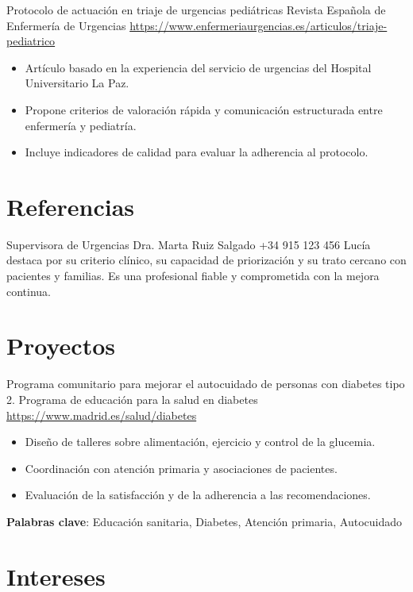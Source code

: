 \documentclass[a4paper, serif, 10pt]{moderncv}
\begin{document}
        {Protocolo de actuación en triaje de urgencias pediátricas}
        {Revista Española de Enfermería de Urgencias}
        {\url{https://www.enfermeriaurgencias.es/articulos/triaje-pediatrico}}
        {}
        {\begin{itemize}
\item Artículo basado en la experiencia del servicio de urgencias del Hospital Universitario La Paz.
\item Propone criterios de valoración rápida y comunicación estructurada entre enfermería y pediatría.
\item Incluye indicadores de calidad para evaluar la adherencia al protocolo.
\end{itemize}}
\section{Referencias}

        {Supervisora de Urgencias}
        {Dra. Marta Ruiz Salgado}
        {+34 915 123 456}
        {}
        {Lucía destaca por su criterio clínico, su capacidad de priorización y su trato cercano con pacientes y familias. Es una profesional fiable y comprometida con la mejora continua.}
\section{Proyectos}

        {Programa comunitario para mejorar el autocuidado de personas con diabetes tipo 2.}
        {Programa de educación para la salud en diabetes}
        {\url{https://www.madrid.es/salud/diabetes}}
        {}
        {\begin{itemize}
\item Diseño de talleres sobre alimentación, ejercicio y control de la glucemia.
\item Coordinación con atención primaria y asociaciones de pacientes.
\item Evaluación de la satisfacción y de la adherencia a las recomendaciones.
\end{itemize}
\textbf{Palabras clave}: Educación sanitaria, Diabetes, Atención primaria, Autocuidado}
\section{Intereses}

\end{document}
